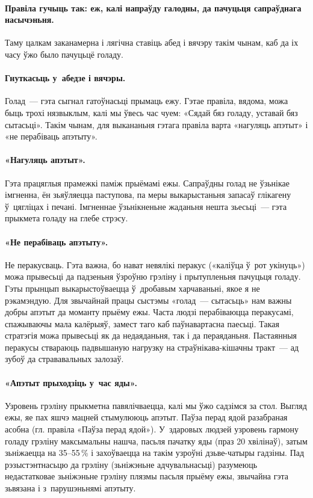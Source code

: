 \paragraph{Правіла гучыць так: еж, калі напраўду галодны, да пачуцьця сапраўднага насычэньня.}
Таму цалкам заканамерна і лягічна ставіць абед і вячэру такім чынам, каб да іх часу ўжо было пачуцьцё голаду.

\paragraph{Гнуткасьць у~абедзе і вячэры.}
Голад~--- гэта сыгнал гатоўнасьці прымаць ежу. Гэтае правіла, вядома, можа быць трохі нязвыклым, калі мы ўвесь час чуем: «Сядай бяз голаду, уставай бяз сытасьці». Такім чынам, для выкананьня гэтага правіла варта «нагуляць апэтыт» і «не перабіваць апэтыту».

\paragraph{«Нагуляць апэтыт».}
Гэта працяглыя прамежкі паміж прыёмамі ежы. Сапраўдны голад не ўзьнікае імгненна, ён зьяўляецца паступова, па меры выкарыстаньня запасаў глікагену ў~цягліцах і печані. Імгненнае ўзьнікненьне жаданьня нешта зьесьці~--- гэта прыкмета голаду на глебе стрэсу.

\paragraph{«Не перабіваць апэтыту».}
Не перакусваць. Гэта важна, бо нават невялікі перакус («каліўца ў~рот укінуць») можа прывесьці да падзеньня ўзроўню грэліну і прытупленьня пачуцьця голаду. Гэты прынцып выкарыстоўваецца ў~дробавым харчаваньні, якое я не рэкамэндую. Для звычайнай працы сыстэмы «голад~--- сытасьць» нам важны добры апэтыт да моманту прыёму ежы. Часта людзі перабіваюцца перакусамі, спажываючы мала калёрыяў, замест таго каб паўнавартасна паесьці. Такая стратэгія можа прывесьці як да недаяданьня, так і да пераяданьня. Пастаянныя перакусы ствараюць падвышаную нагрузку на страўнікава-кішачны тракт~--- ад зубоў да стрававальных залозаў.


\paragraph{«Апэтыт прыходзіць у~час яды».}
Узровень грэліну прыкметна павялічваецца, калі мы ўжо садзімся за стол. Выгляд ежы, яе пах яшчэ мацней стымулююць апэтыт. Паўза перад ядой разабраная асобна (гл. правіла «Паўза перад ядой»). У~здаровых людзей узровень гармону голаду грэліну максымальны нашча, пасьля пачатку яды (праз 20 хвілінаў), затым зьніжаецца на 35--55\,\% і захоўваецца на такім узроўні дзьве-чатыры гадзіны. Пад рэзыстэнтнасьцю да грэліну (зьніжэньне адчувальнасьці) разумеюць недастатковае зьніжэньне грэліну плязмы пасьля прыёму ежы, звычайна гэта зьвязана і з~парушэньнямі апэтыту.

